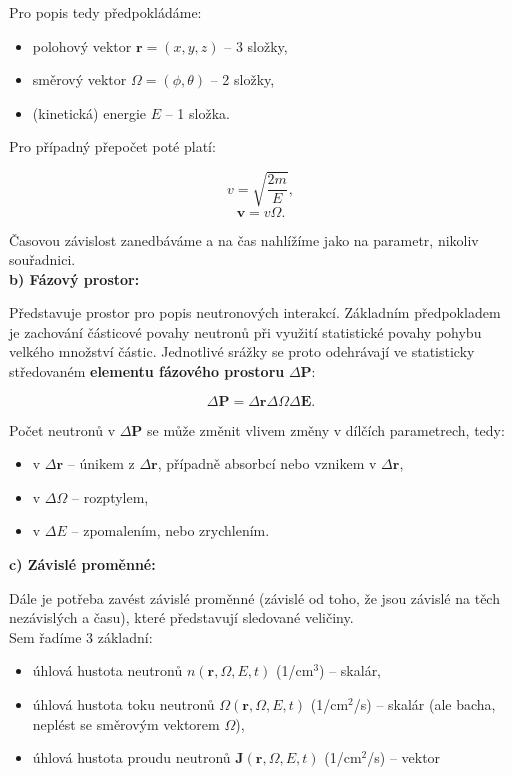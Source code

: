 Pro popis tedy předpokládáme:

\begin{itemize}
  \item polohový vektor $\textbf{r} = (x, y, z)$ -- 3 složky,
  \item směrový vektor $\Omega = (\phi, \theta)$ -- 2 složky,
  \item (kinetická) energie $E$ -- 1 složka.
\end{itemize}

Pro případný přepočet poté platí:

$$ v = \sqrt{\dfrac{2m}{E}}, $$
$$ \textbf{v} = v \Omega. $$

Časovou závislost zanedbáváme a na čas nahlížíme jako na parametr, nikoliv souřadnici.\\

\textbf{b) Fázový prostor:}

Představuje prostor pro popis neutronových interakcí. Základním předpokladem je zachování částicové povahy neutronů při využití statistické povahy pohybu velkého množství částic. Jednotlivé srážky se proto odehrávají ve statisticky středovaném \textbf{elementu fázového prostoru} $\Delta \textbf{P}$:

$$ \Delta \textbf{P} = \Delta \textbf{r} \Delta \Omega \Delta \textbf{E}. $$

Počet neutronů v $\Delta \textbf{P}$ se může změnit vlivem změny v dílčích parametrech, tedy:

\begin{itemize}
  \item v $\Delta \textbf{r}$ -- únikem z $\Delta \textbf{r}$, případně absorbcí nebo vznikem v $\Delta \textbf{r}$,
  \item v $\Delta \Omega$ -- rozptylem,
  \item v $\Delta E$ -- zpomalením, nebo zrychlením.
\end{itemize}

\textbf{c) Závislé proměnné:}

Dále je potřeba zavést závislé proměnné (závislé od toho, že jsou závislé na těch nezávislých a času), které představují sledované veličiny.\\

Sem řadíme 3 základní:

\begin{itemize}
  \item úhlová hustota neutronů $n(\textbf{r}, \Omega, E, t)$ (1/cm$^3$) -- skalár,
  \item úhlová hustota toku neutronů $\Omega(\textbf{r}, \Omega, E, t)$ (1/cm$^2$/s) -- skalár (ale bacha, neplést se směrovým vektorem $\Omega$),
  \item úhlová hustota proudu neutronů $\textbf{J}(\textbf{r}, \Omega, E, t)$ (1/cm$^2$/s) -- vektor
\end{itemize}

